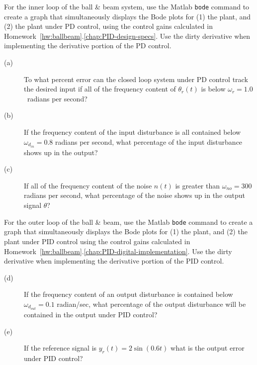 
For the inner loop of the ball \& beam system, use the Matlab \texttt{bode} command to create a graph that simultaneously displays the Bode plots for (1) the plant, and (2) the plant under PD control,  using the control gains calculated in Homework~\ref{hw:ballbeam}.\ref{chap:PID-design-specs}.  Use the dirty derivative when implementing the derivative portion of the PD control.
\begin{description}
\item[(a)]  To what percent error can the closed loop system under PD control track the desired input if all of the frequency content of $\theta_r(t)$ is below $\omega_r = 1.0$~radians per second?
\item[(b)] If the frequency content of the input disturbance is all contained below $\omega_{d_{in}}=0.8$ radians per second, what percentage of the input disturbance shows up in the output?
\item[(c)] If all of the frequency content of the noise $n(t)$ is greater than $\omega_{no} = 300$ radians per second, what percentage of the noise shows up in the output signal $\theta$?
\end{description}

For the outer loop of the ball \& beam, use the Matlab \texttt{bode} command to create a graph that simultaneously displays the Bode plots for (1) the plant, and (2) the plant under PID control using the control gains calculated in Homework~\ref{hw:ballbeam}.\ref{chap:PID-digital-implementation}.  Use the dirty derivative when implementing the derivative portion of the PID control.  
\begin{description}
\item[(d)]  If the frequency content of an output disturbance is contained below $\omega_{d_{out}}=0.1$ radian/sec, what percentage of the output disturbance will be contained in the output under PID control?  
\item[(e)] If the reference signal is $y_r(t) = 2\sin(0.6 t)$ what is the output error under PID control?
\end{description}

